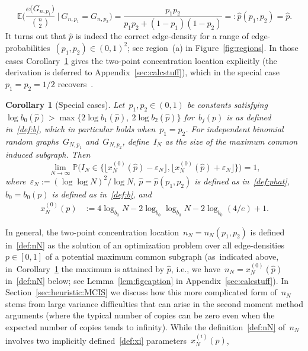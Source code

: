 \documentclass{article}
\newcommand{\eps}{\varepsilon}
\renewcommand{\Pr}{\mathbb{P}}
\newcommand{\E}{\mathbb{E}}
\newcommand{\xot}{x^{(0)}}
\newcommand{\ps}{\hat{p}}
\newtheorem{cor}[thm]{Corollary}
\newcommand\bigpar[1]{\bigl(#1\bigr)}
\newcommand\biggpar[1]{\biggl(#1\biggr)}
\newcommand\bigcpar[1]{\bigl\{#1\bigr\}}
\newcommand\bigfloor[1]{\bigl\lfloor#1\bigr\rfloor}
\begin{document}
\begin{equation}\label{def:phat}
\E\biggpar{\frac{e\bigpar{G_{n,p_1}}}{\binom{n}{2}} \: \bigg| \: G_{n,p_1} =G_{n,p_2}}=\frac{p_1p_2}{p_1p_2+(1-p_1)(1-p_2)} = : \ps(p_1,p_2) = \ps.
\end{equation}
It turns out that $\ps$ is indeed the correct edge-density
for a range of edge-probabilities~${(p_1,p_2) \in (0,1)^2}$; see region~(a) in Figure~\ref{fig:regions}. 
In those cases Corollary~\ref{cor:equalprob} gives the two-point concentration location explicitly (the derivation is deferred to Appendix~\ref{sec:calcstuff}), 
which in the special case~$p_1=p_2=1/2$ recovers~\cite[Theorem~1.1]{chatterjee2021isomorphisms}. 
\begin{cor}[Special cases]\label{cor:equalprob}Let~$p_1,p_2\in (0,1)$ be constants 
satisfying~$\log b_0(\hat{p}) > \max\bigcpar{2\log b_1(\hat{p}), \: 2\log b_2(\hat{p})}$ for~$b_j(p)$ is as defined in~\eqref{def:b}, which in particular holds when~$p_1=p_2$.  
For independent binomial random graphs~$G_{N,p_1}$ and~$G_{N,p_2}$, 
define~$I_{N}$ as the size of the maximum common induced subgraph. 
Then 
\begin{equation}\label{eq:equalprob}
\lim_{N \to \infty}\Pr\bigpar{I_N \in \bigcpar{\bigfloor{\xot_N(\ps)-\eps_N}, \bigfloor{\xot_N(\ps)+\eps_N}}} = 1 ,
\end{equation}
where~$\eps_N:=(\log \log N)^2/\log N$, $\ps=\ps(p_1,p_2)$ is defined as in~\eqref{def:phat}, $b_0=b_0(p)$ is defined as in~\eqref{def:b}, and 
\begin{align}
\label{def:x_N}
\xot_N(p) &:=  4\log_{b_0} N - 2\log_{b_0}\log_{b_0} N-2\log_{b_0} (4/e) +1.
\end{align}
\end{cor}
In general, the two-point concentration location~$n_N=n_N(p_1,p_2)$ is defined in~\eqref{def:nN} 
as the solution of an optimization problem over all edge-densities~$p \in [0,1]$ of a potential maximum common subgraph (as~indicated above, in~Corollary~\ref{cor:equalprob} the maximum is attained by $\hat{p}$, i.e., we have~$n_N=\xot_N(\ps)$ in~\eqref{def:nN} below; see Lemma~\ref{lem:figcaption} in Appendix~\ref{sec:calcstuff}). 
In Section~\ref{sec:heuristic:MCIS} we discuss how this more complicated form of~$n_N$ stems from 
large variance difficulties that can arise in the second moment method arguments 
(where the typical number of copies can be zero even when the expected number of copies tends to infinity). 
While the definition~\eqref{def:nN} of~$n_N$ involves two implicitly defined~\eqref{def:xi} parameters~$x^{(i)}_N(p)$, 
\end{document}
